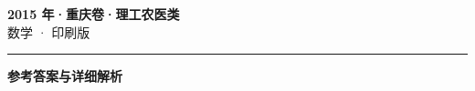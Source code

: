 \documentclass[zihao=5, a4paper]{ctexart}
\begin{document}
\begin{center}
  {\Large\bfseries 2015 年·重庆卷·理工农医类}\\[4pt]
  {\large 数学 · 印刷版}
\end{center}
\medskip
{}

\par\bigskip\hrule\bigskip
{}
\begin{center}{\large\bfseries 参考答案与详细解析}\end{center}
\smallskip

\end{document}
